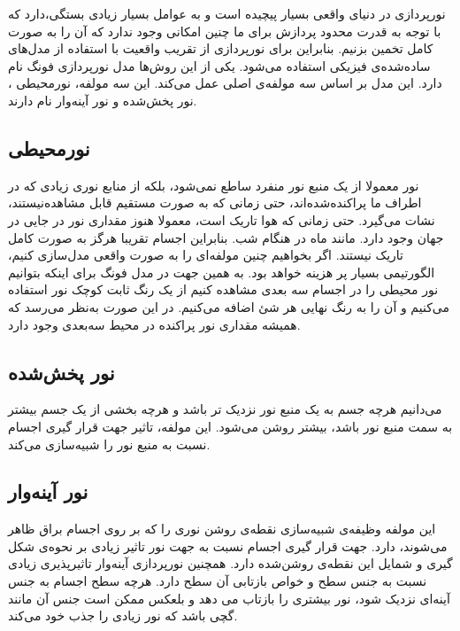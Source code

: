 نورپردازی در دنیای واقعی بسیار پیچیده است و
به عوامل بسیار زیادی بستگی،دارد که با توجه به 
قدرت محدود پردازش برای ما چنین امکانی وجود ندارد که آن را 
به صورت کامل تخمین بزنیم.
بنابراین برای نورپردازی از تقریب‌ واقعیت 
با استفاده از مدل‌های ساده‌شده‌ی فیزیکی استفاده می‌شود.
یکی از این روش‌ها مدل نورپردازی فونگ نام دارد.
این مدل بر اساس سه مولفه‌ی اصلی عمل می‌کند.
این سه ‌مولفه، نورمحیطی
، نور پخش‌شده
و نور آینه‌وار
نام دارند.
\cite{LearnOpenGLPhongShading}
\subsection{نورمحیطی}

نور معمولا از یک منبع نور منفرد ساطع نمی‌شود، بلکه
از منابع نوری زیادی که در اطراف ما پراکنده‌شده‌اند،
حتی زمانی که به صورت مستقیم قابل مشاهده‌نیستند،
نشات می‌گیرد.
حتی زمانی که هوا تاریک است، معمولا هنوز مقداری 
نور در جایی در جهان وجود دارد.
مانند ماه در هنگام شب.
بنابراین اجسام تقریبا هرگز به صورت کامل 
تاریک نیستند.
اگر بخواهیم چنین مولفه‌ای را به صورت واقعی مدل‌سازی کنیم، 
الگورتیمی بسیار پر هزینه خواهد بود.
به همین جهت در مدل فونگ برای اینکه بتوانیم نور محیطی را 
در اجسام سه بعدی مشاهده کنیم 
از یک رنگ ثابت کوچک نور استفاده می‌کنیم و آن را به 
رنگ نهایی هر شئ اضافه می‌کنیم.
در این صورت به‌نظر می‌رسد که همیشه مقداری نور پراکنده در محیط 
سه‌بعدی وجود دارد.
\cite{LearnOpenGLPhongShading}
\subsection{نور پخش‌شده}

می‌دانیم هرچه جسم به یک منبع نور نزدیک تر باشد و هرچه 
بخشی از یک جسم بیشتر به سمت منبع نور باشد، بیشتر روشن می‌شود.
این مولفه، تاثیر جهت قرار گیری 
اجسام نسبت به منبع نور را شبیه‌سازی می‌کند.
\cite{LearnOpenGLPhongShading}
\subsection{نور آینه‌وار}

این مولفه وظیفه‌ی شبیه‌سازی نقطه‌ی روشن نوری را که 
بر روی اجسام براق ظاهر می‌شوند، دارد.
جهت قرار گیری اجسام نسبت به جهت نور 
تاثیر زیادی بر نحوه‌ی شکل گیری و شمایل این 
نقطه‌ی روشن‌شده دارد.
همچنین نورپردازی آینه‌وار تاثیرپذیری زیادی 
نسبت به جنس سطح و خواص بازتابی آن سطح دارد.
هرچه سطح اجسام به جنس آینه‌ای نزدیک شود، نور بیشتری را بازتاب می دهد 
و بلعکس ممکن است جنس آن مانند گچی باشد که نور زیادی را جذب خود می‌کند.
\cite{LearnOpenGLPhongShading}

